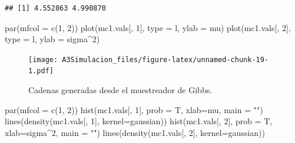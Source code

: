 \documentclass[
  10pt,
  spanish,
]{book}
\newenvironment{Shaded}{\begin{snugshade}}{\end{snugshade}}
\newcommand{\AttributeTok}[1]{\textcolor[rgb]{0.77,0.63,0.00}{#1}}
\newcommand{\DecValTok}[1]{\textcolor[rgb]{0.00,0.00,0.81}{#1}}
\newcommand{\FunctionTok}[1]{\textcolor[rgb]{0.00,0.00,0.00}{#1}}
\newcommand{\NormalTok}[1]{#1}
\newcommand{\StringTok}[1]{\textcolor[rgb]{0.31,0.60,0.02}{#1}}
\theoremstyle{definition}
\theoremstyle{definition}
\theoremstyle{definition}
\theoremstyle{definition}
\theoremstyle{remark}
\begin{document}
\begin{verbatim}
## [1] 4.552863 4.990870
\end{verbatim}

\begin{Shaded}
\begin{Highlighting}[]
\FunctionTok{par}\NormalTok{(}\AttributeTok{mfcol =} \FunctionTok{c}\NormalTok{(}\DecValTok{1}\NormalTok{, }\DecValTok{2}\NormalTok{))}
\FunctionTok{plot}\NormalTok{(mc1.vals[, }\DecValTok{1}\NormalTok{], }\AttributeTok{type =} \StringTok{\textquotesingle{}l\textquotesingle{}}\NormalTok{, }\AttributeTok{ylab =} \StringTok{\textquotesingle{}mu\textquotesingle{}}\NormalTok{)}
\FunctionTok{plot}\NormalTok{(mc1.vals[, }\DecValTok{2}\NormalTok{], }\AttributeTok{type =} \StringTok{\textquotesingle{}l\textquotesingle{}}\NormalTok{, }\AttributeTok{ylab =} \StringTok{\textquotesingle{}sigma\^{}2\textquotesingle{}}\NormalTok{)}
\end{Highlighting}
\end{Shaded}

\begin{figure}
\centering
\texttt{[image: A3Simulacion\_files/figure-latex/unnamed-chunk-19-1.pdf]}
\caption{\label{fig:unnamed-chunk-19}Cadenas generadas desde el muestreador de Gibbs.}
\end{figure}

\begin{Shaded}
\begin{Highlighting}[]
\FunctionTok{par}\NormalTok{(}\AttributeTok{mfcol =} \FunctionTok{c}\NormalTok{(}\DecValTok{1}\NormalTok{, }\DecValTok{2}\NormalTok{))}
\FunctionTok{hist}\NormalTok{(mc1.vals[, }\DecValTok{1}\NormalTok{], }\AttributeTok{prob =}\NormalTok{ T, }\AttributeTok{xlab=}\StringTok{\textquotesingle{}mu\textquotesingle{}}\NormalTok{, }\AttributeTok{main =} \StringTok{""}\NormalTok{)}
\FunctionTok{lines}\NormalTok{(}\FunctionTok{density}\NormalTok{(mc1.vals[, }\DecValTok{1}\NormalTok{], }\AttributeTok{kernel=}\StringTok{\textquotesingle{}gaussian\textquotesingle{}}\NormalTok{))}
\FunctionTok{hist}\NormalTok{(mc1.vals[, }\DecValTok{2}\NormalTok{], }\AttributeTok{prob =}\NormalTok{ T, }\AttributeTok{xlab=}\StringTok{\textquotesingle{}sigma\^{}2\textquotesingle{}}\NormalTok{, }\AttributeTok{main =} \StringTok{""}\NormalTok{)}
\FunctionTok{lines}\NormalTok{(}\FunctionTok{density}\NormalTok{(mc1.vals[, }\DecValTok{2}\NormalTok{], }\AttributeTok{kernel=}\StringTok{\textquotesingle{}gaussian\textquotesingle{}}\NormalTok{))}
\end{Highlighting}
\end{Shaded}
\end{document}
